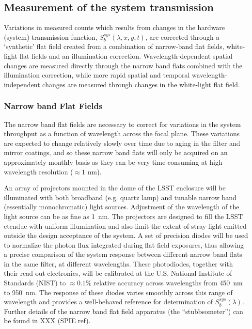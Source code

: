 \documentclass[12pt,preprint]{aastex}
\begin{document}
\subsection{Measurement of the system transmission}

Variations in measured counts which results from changes in the hardware
(system) transmission function, $S_b^{sys}(\lambda,x,y,t)$, are corrected
through a `synthetic' flat field created from a combination of
narrow-band flat fields, white-light flat fields and an illumination correction.
Wavelength-dependent spatial changes are measured directly through the
narrow band flats combined with the illumination correction, while
more rapid spatial and temporal wavelength-independent changes are
measured through changes in the white-light flat field.

\subsubsection{Narrow band Flat Fields}
\label{sec:narrowband}

The narrow band flat fields are necessary to correct for variations in
the system throughput as a function of wavelength across the focal
plane. These variations are expected to change relatively slowly over
time due to aging in the filter and mirror coatings, and so these
narrow band flats will only be acquired on an approximately monthly
basis as they can be very time-consuming at high wavelength resolution
($\approx1$ nm).

An array of projectors mounted in the dome of the LSST enclosure will
be illuminated with both broadband (e.g. quartz lamp) and tunable
narrow band (essentially monochromatic) light sources.  Adjustment of
the wavelength of the light source can be as fine as 1~nm. The
projectors are designed to fill the LSST etendue with uniform
illumination and also limit the extent of stray light emitted outside
the design acceptance of the system. A set of precision diodes will be
used to normalize the photon flux integrated during flat field
exposures, thus allowing a precise comparison of the system response
between different narrow band flats in the same filter, at different
wavelengths.  These photodiodes, together with their read-out
electronics, will be calibrated at the U.S. National Institute of
Standards (NIST) to $\approx0.1\%$ relative accuracy across
wavelengths from 450~nm to 950~nm. The response of these diodes varies
smoothly across this range of wavelength and provides a well-behaved
reference for determination of $S_b^{sys}(\lambda)$.  Further details
of the narrow band flat field apparatus (the ``stubbsometer'') can be
found in XXX (SPIE ref). 
\end{document}
